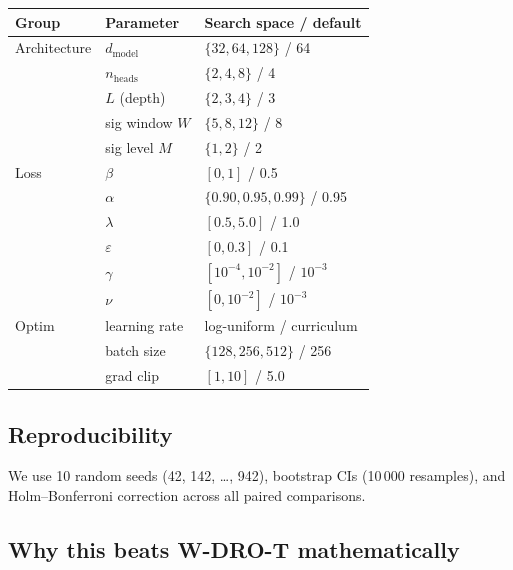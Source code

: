 \documentclass[11pt,a4paper]{article}
\begin{document}
\begin{center}
\begin{tabular}{@{}lll@{}}
\toprule
Group & Parameter & Search space / default \\
\midrule
Architecture & $d_{\mathrm{model}}$ & $\{32, 64, 128\}$ / 64 \\
& $n_{\mathrm{heads}}$ & $\{2, 4, 8\}$ / 4 \\
& $L$ (depth) & $\{2, 3, 4\}$ / 3 \\
& sig window $W$ & $\{5, 8, 12\}$ / 8 \\
& sig level $M$ & $\{1, 2\}$ / 2 \\
Loss & $\beta$ & $[0, 1]$ / 0.5 \\
& $\alpha$ & $\{0.90, 0.95, 0.99\}$ / 0.95 \\
& $\lambda$ & $[0.5, 5.0]$ / 1.0 \\
& $\varepsilon$ & $[0, 0.3]$ / 0.1 \\
& $\gamma$ & $[10^{-4}, 10^{-2}]$ / $10^{-3}$ \\
& $\nu$ & $[0, 10^{-2}]$ / $10^{-3}$ \\
Optim & learning rate & log-uniform / curriculum \\
& batch size & $\{128, 256, 512\}$ / 256 \\
& grad clip & $[1, 10]$ / 5.0 \\
\bottomrule
\end{tabular}
\end{center}

\subsection{Reproducibility}

We use 10 random seeds (42, 142, \ldots, 942), bootstrap CIs (10\,000
resamples), and Holm--Bonferroni correction across all paired comparisons.

\subsection{Why this beats W-DRO-T mathematically}
\end{document}
